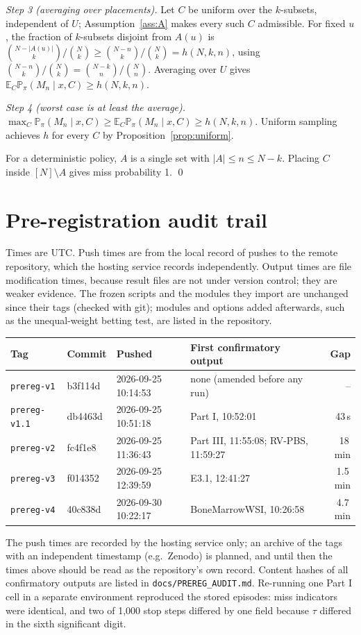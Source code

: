 \documentclass[11pt]{article}
\theoremstyle{remark}
\theoremstyle{definition}
\newcommand{\Prb}{\mathbb{P}}
\newcommand{\E}{\mathbb{E}}
\begin{document}
\emph{Step 3 (averaging over placements).} Let $C$ be uniform over the $k$-subsets, independent of $U$; Assumption~\ref{ass:A} makes every such $C$ admissible. For fixed $u$, the fraction of $k$-subsets disjoint from $A(u)$ is $\binom{N-|A(u)|}{k}/\binom{N}{k}\ge\binom{N-n}{k}/\binom{N}{k}=h(N,k,n)$, using $\binom{N-n}{k}/\binom{N}{k}=\binom{N-k}{n}/\binom{N}{n}$. Averaging over $U$ gives $\E_C\Prb_\pi(M_n\mid x,C)\ge h(N,k,n)$.

\emph{Step 4 (worst case is at least the average).} $\max_C\Prb_\pi(M_n\mid x,C)\ge\E_C\Prb_\pi(M_n\mid x,C)\ge h(N,k,n)$. Uniform sampling achieves $h$ for every $C$ by Proposition~\ref{prop:uniform}.

For a deterministic policy, $A$ is a single set with $|A|\le n\le N-k$. Placing $C$ inside $[N]\setminus A$ gives miss probability 1. \qed

\section{Pre-registration audit trail}\label{app:audit}
Times are UTC. Push times are from the local record of pushes to the remote repository, which the hosting service records independently. Output times are file modification times, because result files are not under version control; they are weaker evidence. The frozen scripts and the modules they import are unchanged since their tags (checked with git); modules and options added afterwards, such as the unequal-weight betting test, are listed in the repository.

\begin{center}\small
\begin{tabular}{@{}llllr@{}}
\toprule
Tag & Commit & Pushed & First confirmatory output & Gap\\
\midrule
\texttt{prereg-v1} & b3f114d & 2026-09-25 10:14:53 & none (amended before any run) & --\\
\texttt{prereg-v1.1} & db4463d & 2026-09-25 10:51:18 & Part I, 10:52:01 & 43\,s\\
\texttt{prereg-v2} & fc4f1e8 & 2026-09-25 11:36:43 & Part III, 11:55:08; RV-PBS, 11:59:27 & 18\,min\\
\texttt{prereg-v3} & f014352 & 2026-09-25 12:39:59 & E3.1, 12:41:27 & 1.5\,min\\
\texttt{prereg-v4} & 40c838d & 2026-09-30 10:22:17 & BoneMarrowWSI, 10:26:58 & 4.7\,min\\
\bottomrule
\end{tabular}
\end{center}
The push times are recorded by the hosting service only; an archive of the tags with an independent timestamp (e.g.\ Zenodo) is planned, and until then the times above should be read as the repository's own record. Content hashes of all confirmatory outputs are listed in \texttt{docs/PREREG\_AUDIT.md}. Re-running one Part I cell in a separate environment reproduced the stored episodes: miss indicators were identical, and two of 1,000 stop steps differed by one field because $\tau$ differed in the sixth significant digit.




\end{document}
